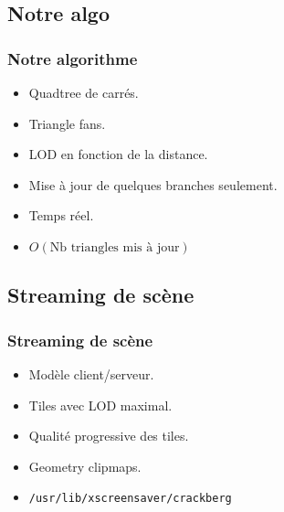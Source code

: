 \documentclass[hyperref={pdfpagelabels=false}]{beamer}
\begin{document}
\subsection{Notre algo}
\begin{frame}
  \frametitle{Notre algorithme}
  \begin{itemize}
  \item Quadtree de carrés.
  \item Triangle fans.
  \item LOD en fonction de la distance.
  \item Mise à jour de quelques branches seulement.
  \item Temps réel.
  \item $O(\text{Nb triangles mis à jour})$
  \end{itemize}
\end{frame}

\subsection{Streaming de scène}
\begin{frame}
  \frametitle{Streaming de scène}
  \begin{itemize}
  \item Modèle client/serveur.
  \item Tiles avec LOD maximal.
  \item Qualité progressive des tiles.
  \item Geometry clipmaps.
  \item \texttt{/usr/lib/xscreensaver/crackberg}
  \end{itemize}
\end{frame}


\end{document}
